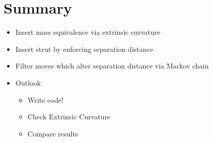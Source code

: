 \documentclass{article}
\begin{document}
\section{Summary}
\begin{itemize}
\item Insert mass equivalence via extrinsic curvature
\item Insert strut by enforcing separation distance
\item Filter moves which alter separation distance via Markov chain
\item Outlook

\begin{itemize}
\item Write code!
\item Check Extrinsic Curvature
\item Compare results
\end{itemize}
\end{itemize}



\end{document}
